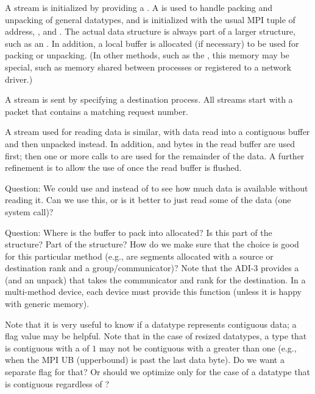 \begin{enumerate}
    A stream is initialized by providing a .  A
     is used to handle packing and unpacking of general 
    datatypes, and is initialized with the usual MPI tuple of
     address, , and .  The
    actual  data structure is always part of a larger 
    structure, such as an .  In addition, 
    a local buffer is allocated (if necessary) to be used for packing
    or unpacking.  (In other methods, such as the \shmemname, this
    memory may be special, such as memory shared between processes or
    registered to a network driver.)  

    A stream is sent by specifying a destination process.  All streams
    start with a  packet that contains a
    matching request number.

    A stream used for reading data is similar, with data read into a
    contiguous buffer and then unpacked instead.  In addition, and bytes in
    the read buffer are used first; then one or more calls to  are
    used for the remainder of the data.  A further refinement is to allow the
    use of  once the read buffer is flushed.  

    Question: We could use  and  instead of
     to see how much data is available without reading it.  Can we
    use this, or is it better to just read some of the data (one system call)?


  Question: Where is the buffer to pack into allocated?  Is this part of the 
   structure?  Part of the 
  structure? How do we make sure that the choice is
  good for this particular method (e.g., are segments allocated with a source
  or destination rank and a group/communicator)?  Note that the ADI-3 provides
  a  (and an unpack) that takes the
  communicator and rank for the destination.  In a multi-method device, each
  device must provide this function (unless it is happy with generic memory).

  Note that it is very useful to know if a datatype represents contiguous
  data; a  flag value may be helpful.  Note
  that in the case of resized datatypes, a type that is contiguous with a
   of $1$ may not be contiguous with a  greater than
  one (e.g., when the MPI UB (upperbound) is past the last data byte).  Do we
  want a separate flag for that?  Or should we optimize only for 
  the case of a datatype that is contiguous regardless of ?


\end{enumerate}
